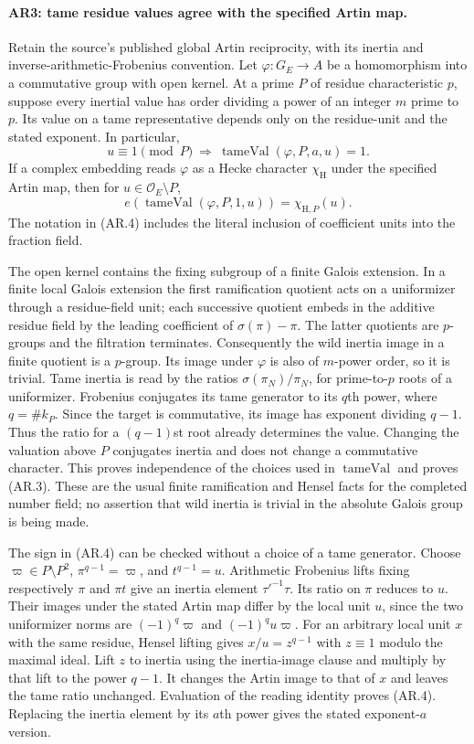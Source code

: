 \paragraph{AR3: tame residue values agree with the specified Artin map.}
Retain the source's published global Artin reciprocity, with its
inertia and inverse-arithmetic-Frobenius convention. Let $\varphi:G_E\to A$
be a homomorphism into a commutative group with open kernel. At a prime
$P$ of residue characteristic $p$, suppose every inertial value has
order dividing a power of an integer $m$ prime to $p$.
Its value on a tame representative depends only on the residue-unit
and the stated exponent. In particular,
\[
 u\equiv1\pmod P\ \Longrightarrow\
 \operatorname{tameVal}(\varphi,P,a,u)=1.                 \tag{AR.3}
\]
If a complex embedding reads $\varphi$ as a Hecke character $\chi_{\mathrm H}$
under the specified Artin map, then for $u\in\mathcal O_E\setminus P$,
\[
 e\!\left(\operatorname{tameVal}(\varphi,P,1,u)\right)
       =\chi_{\mathrm H,P}(u).                          \tag{AR.4}
\]
The notation in (AR.4) includes the literal inclusion of coefficient
units into the fraction field.

The open kernel contains the fixing subgroup of a finite Galois
extension. In a finite local Galois extension the first ramification
quotient acts on a uniformizer through a residue-field unit; each
successive quotient embeds in the additive residue field by the
leading coefficient of $\sigma(\pi)-\pi$. The latter quotients are
$p$-groups and the filtration terminates. Consequently the wild inertia
image in a finite quotient is a $p$-group. Its image under $\varphi$ is
also of $m$-power order, so it is trivial. Tame inertia is read by the
ratios $\sigma(\pi_N)/\pi_N$, for prime-to-$p$ roots of a uniformizer.
Frobenius conjugates its tame generator to its $q$th power, where
$q=\#k_P$. Since the target is commutative, its image has exponent
dividing $q-1$. Thus the ratio for a $(q-1)$st root already determines
the value. Changing the valuation above $P$ conjugates inertia and
does not change a commutative character. This proves independence of
the choices used in $\operatorname{tameVal}$ and proves (AR.3).
These are the usual finite ramification and Hensel facts for the
completed number field; no assertion that wild inertia is trivial
in the absolute Galois group is being made.

The sign in (AR.4) can be checked without a choice of a tame generator.
Choose $\varpi\in P\setminus P^2$, $\pi^{q-1}=\varpi$, and
$t^{q-1}=u$. Arithmetic Frobenius lifts fixing respectively $\pi$ and
$\pi t$ give an inertia element $\tau'^{-1}\tau$. Its ratio on $\pi$
reduces to $u$. Their images under the stated Artin map differ by the
local unit $u$, since the two uniformizer norms are
$(-1)^q\varpi$ and $(-1)^qu\varpi$. For an arbitrary local unit $x$
with the same residue, Hensel lifting gives
$x/u=z^{q-1}$ with $z\equiv1$ modulo the maximal ideal. Lift $z$ to
inertia using the inertia-image clause and multiply by that lift to
the power $q-1$. It changes the Artin image to that of $x$ and leaves
the tame ratio unchanged. Evaluation of the reading identity proves
(AR.4). Replacing the inertia element by its $a$th power gives the
stated exponent-$a$ version.


